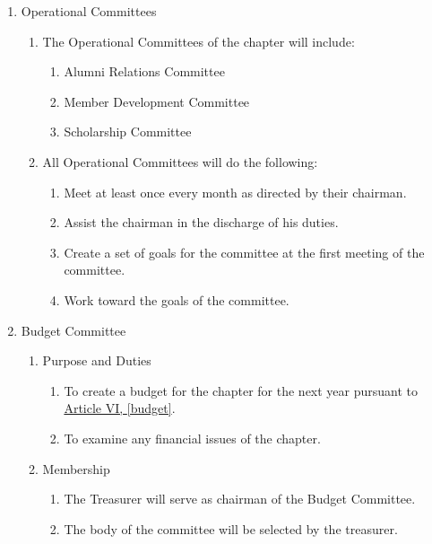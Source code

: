 \begin{enumerate}
\begin{enumerate}
			\item Operational Committees \label{op-comm}
				\begin{enumerate}	
					\item The Operational Committees of the chapter will include:
					
						\begin{enumerate}
							\item Alumni Relations Committee
							\item Member Development Committee
							\item Scholarship Committee
						\end{enumerate}
					
					\item All Operational Committees will do the following:
						\begin{enumerate}
							\item Meet at least once every month as directed by their chairman.
							\item Assist the chairman in the discharge of his duties.
							\item Create a set of goals for the committee at the first meeting of the committee.
							\item Work toward the goals of the committee.
						\end{enumerate}
				\end{enumerate}

			\item Budget Committee
				\label{budget-committee}
				\begin{enumerate}
					\item Purpose and Duties
						\begin{enumerate}
							\item To create a budget for the chapter for the next year pursuant to \hyperref[budget]{Article VI, \autoref*{budget}}.
							\item To examine any financial issues of the chapter.
						\end{enumerate}

					\item Membership
						\begin{enumerate}
							\item The Treasurer will serve as chairman of the Budget Committee.
							\item The body of the committee will be selected by the treasurer.
						\end{enumerate}


\end{enumerate}
\end{enumerate}
\end{enumerate}
